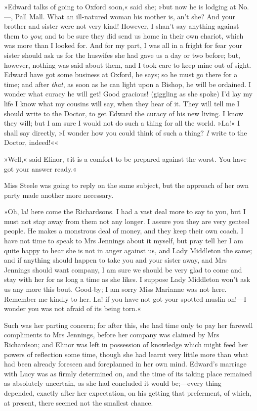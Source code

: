 »Edward talks of going to Oxford soon,« said she; »but now he is lodging at No.—, Pall Mall. What an ill-natured woman his mother is, an’t she? And your brother and sister were not very kind! However, I shan’t say anything against them to \textit{you}; and to be sure they did send us home in their own chariot, which was more than I looked for. And for my part, I was all in a fright for fear your sister should ask us for the huswifes she had gave us a day or two before; but, however, nothing was said about them, and I took care to keep mine out of sight. Edward have got some business at Oxford, he says; so he must go there for a time; and after \textit{that}, as soon as he can light upon a Bishop, he will be ordained. I wonder what curacy he will get! Good gracious! (giggling as she spoke) I’d lay my life I know what my cousins will say, when they hear of it. They will tell me I should write to the Doctor, to get Edward the curacy of his new living. I know they will; but I am sure I would not do such a thing for all the world. »La!« I shall say directly, »I wonder how you could think of such a thing? \textit{I} write to the Doctor, indeed!««

»Well,« said Elinor, »it is a comfort to be prepared against the worst. You have got your answer ready.«

Miss Steele was going to reply on the same subject, but the approach of her own party made another more necessary.

»Oh, la! here come the Richardsons. I had a vast deal more to say to you, but I must not stay away from them not any longer. I assure you they are very genteel people. He makes a monstrous deal of money, and they keep their own coach. I have not time to speak to Mrs Jennings about it myself, but pray tell her I am quite happy to hear she is not in anger against us, and Lady Middleton the same; and if anything should happen to take you and your sister away, and Mrs Jennings should want company, I am sure we should be very glad to come and stay with her for as long a time as she likes. I suppose Lady Middleton won’t ask us any more this bout. Good-by; I am sorry Miss Marianne was not here. Remember me kindly to her. La! if you have not got your spotted muslin on!—I wonder you was not afraid of its being torn.«

Such was her parting concern; for after this, she had time only to pay her farewell compliments to Mrs Jennings, before her company was claimed by Mrs Richardson; and Elinor was left in possession of knowledge which might feed her powers of reflection some time, though she had learnt very little more than what had been already foreseen and foreplanned in her own mind. Edward’s marriage with Lucy was as firmly determined on, and the time of its taking place remained as absolutely uncertain, as she had concluded it would be;—every thing depended, exactly after her expectation, on his getting that preferment, of which, at present, there seemed not the smallest chance.

